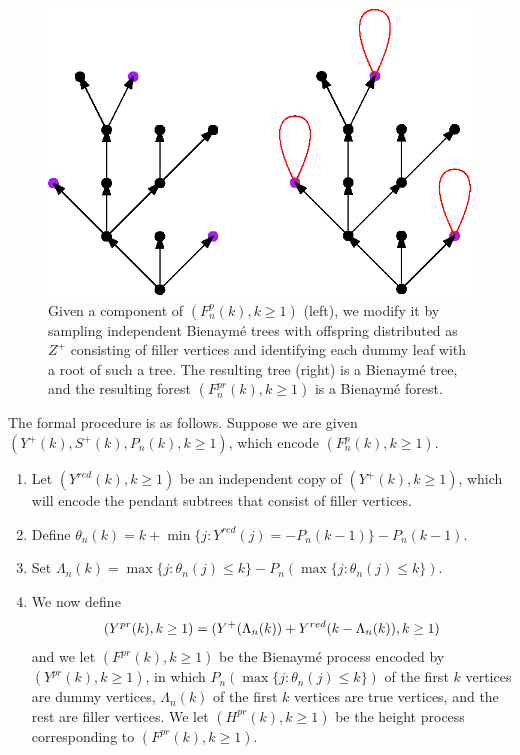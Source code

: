 \begin{figure}
    \centering
    \includegraphics[scale=0.6]{Content/Pictures/black_purple_red_tree.eps}
    \caption{Given a component of $(F^p_n(k),k\geq 1)$ (left), we modify it by sampling independent Bienaymé trees with offspring distributed as $Z^+$ consisting of filler vertices and identifying each dummy leaf with a root of such a tree. The resulting tree (right) is a Bienaymé tree, and the resulting forest $(F^{pr}_n(k),k\geq 1)$ is a Bienaymé forest.}
    \label{fig.blackpurpleredforest}
\end{figure}
The formal procedure is as follows. Suppose we are given $(Y^+(k),S^{+}(k),P_n(k),k\geq 1)$, which encode $(F^p_n(k),k\geq 1)$.
\begin{enumerate}
    \item Let $(Y^{red}(k),k\geq 1)$ be an independent copy of $(Y^+(k),k\geq 1)$, which will encode the pendant subtrees that consist of filler vertices.
    \item Define $\theta_n(k)=k+\min\{j: Y^{red}(j)=-P_n(k-1)\}-P_n(k-1)$. 
    \item Set $\Lambda_n(k)=\max\{j:\theta_n(j)\leq k\}-P_n(\max\{j:\theta_n(j)\leq k\})$. 
    \item We now define \begin{equation}\label{eq.definitionY^{pr}}(Y^{pr}(k),k\geq 1)=(Y^+(\Lambda_n(k))+Y^{red}(k-\Lambda_n(k)),k\geq 1)\end{equation}
    and we let $(F^{pr}(k),k\geq 1)$ be the Bienaymé process encoded by $(Y^{pr}(k),k\geq 1)$, in which $P_n(\max\{j:\theta_n(j)\leq k\})$ of the first $k$ vertices are dummy vertices, $\Lambda_n(k)$ of the first $k$ vertices are true vertices, and the rest are filler vertices. We let $(H^{pr}(k),k\geq 1)$ be the height process corresponding to $(F^{pr}(k),k\geq 1)$.
\end{enumerate}
